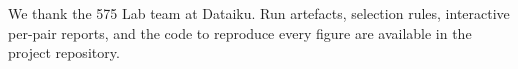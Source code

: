 \documentclass{article}
\begin{document}
\clearpage

\begin{ack}
We thank the 575 Lab team at Dataiku. Run artefacts, selection rules,
interactive per-pair reports, and the code to reproduce every figure are
available in the project repository.
\end{ack}





\end{document}
